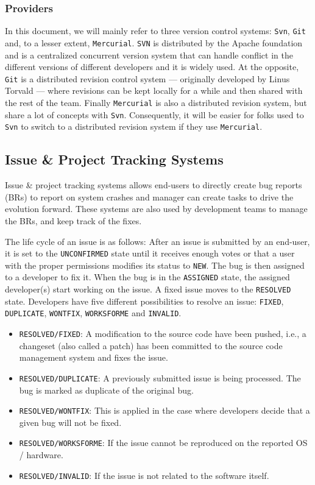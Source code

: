 \subsubsection{Providers\label{sec:revision-provider}}

In this document, we will mainly refer to three version control systems: {\tt Svn}, {\tt Git} and, to a lesser extent, {\tt Mercurial}. {\tt SVN} is distributed by the Apache foundation and is a centralized concurrent version system that can handle conflict in the different versions of different developers and it is widely used.
At the opposite, {\tt Git} is a distributed revision control system --- originally developed by Linus Torvald --- where revisions can be kept locally for a while and then shared with the rest of the team.
Finally {\tt Mercurial} is also a distributed revision system, but share a lot of concepts with {\tt Svn}.
Consequently, it will be easier for folks used to {\tt Svn} to switch to a distributed revision system if they use {\tt Mercurial}.

\subsection{Issue \& Project Tracking Systems\label{sec:issue-tracking}}

Issue \& project tracking systems allows end-users to directly create bug reports (BRs) to report on system crashes and manager can create tasks to drive the evolution forward.
These systems are also used by development teams to manage the BRs, and keep track of the fixes.

The life cycle of an issue is as follows: After an issue is submitted by an end-user, it is set to the {\tt UNCONFIRMED} state until it receives enough votes or that a user with the proper permissions modifies its status to {\tt NEW}.
The bug is then assigned to a developer to fix it.
When the bug is in the {\tt ASSIGNED} state, the assigned developer(s) start working on the issue.
A fixed issue moves to the {\tt RESOLVED} state. Developers have five different possibilities to resolve an issue: {\tt FIXED}, {\tt DUPLICATE}, {\tt WONTFIX}, {\tt WORKSFORME} and {\tt INVALID}.

\begin{itemize}
	\item {\tt RESOLVED/FIXED}: A modification to the source code have been pushed, i.e., a changeset (also called a patch) has been committed to the source code management system and fixes the issue.
	\item {\tt RESOLVED/DUPLICATE}: A previously submitted issue is being processed. The bug is marked as duplicate of the original bug.
	\item {\tt RESOLVED/WONTFIX}: This is applied in the case where developers decide that a given bug will not be fixed.
	\item {\tt RESOLVED/WORKSFORME}: If the issue cannot be reproduced on the reported OS / hardware.
	\item {\tt RESOLVED/INVALID}: If the issue is not related to the software itself.
\end{itemize}

